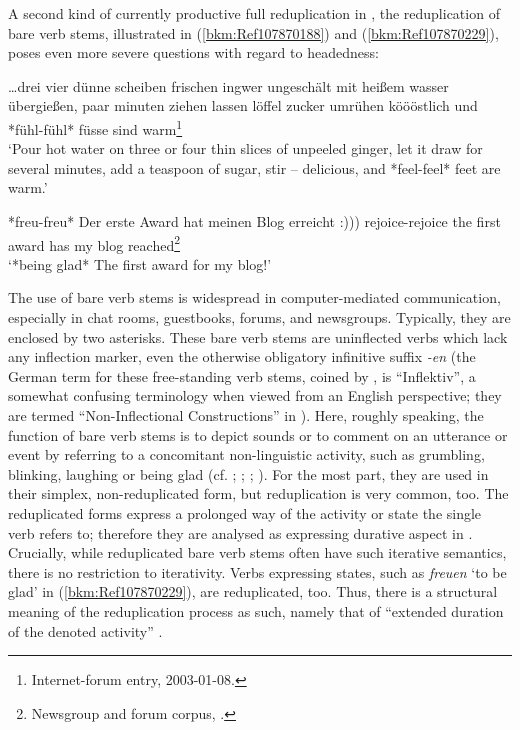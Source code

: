 \documentclass[output=paper
  ,nobabel
  ,draftmode
  ,colorlinks, citecolor=brown
]{langscibook}
\begin{document}
A second kind of currently productive full reduplication in , the reduplication of bare verb
stems, illustrated in (\ref{bkm:Ref107870188}) and (\ref{bkm:Ref107870229}), poses even more severe
questions with regard to headedness:

\ea
\label{bkm:Ref107870188}%
\ldots drei vier dünne scheiben frischen ingwer ungeschält mit heißem wasser übergießen, paar minuten ziehen lassen löffel zucker umrühen köööstlich und *fühl-fühl* füsse sind warm\footnote{Internet-forum entry, 2003-01-08.}\\
`Pour hot water on three or four thin slices of unpeeled ginger, let it draw for several minutes, add a teaspoon of sugar, stir – delicious, and *feel-feel* feet are warm.'
\z

\ea
\label{bkm:Ref107870229}%
*freu-freu*        Der erste Award hat  meinen Blog  erreicht :)))    rejoice-rejoice   the  first award   has  my       blog   reached\footnote{Newsgroup and forum corpus, .} \\
`*being glad* The first award for my blog!'
\z

\noindent
The use of bare verb stems is widespread in computer-mediated communication, especially in chat
rooms, guestbooks, forums, and newsgroups. Typically, they are enclosed by two asterisks. These bare
verb stems are uninflected verbs which lack any inflection marker, even the otherwise obligatory
infinitive suffix \emph{{}-en} (the German term for these free-standing verb stems, coined by
\citet{Teuber1999}, is ``Inflektiv'', a somewhat confusing terminology when viewed from an English
perspective; they are termed ``Non-Inflectional Constructions'' in ). Here,
roughly speaking, the function of bare verb stems is to depict sounds or to comment on an utterance
or event by referring to a concomitant non-linguistic activity, such as grumbling, blinking,
laughing or being glad (cf. \citealt[22--25]{Teuber1999}; \citealt[193--206]{Schlobinski2001};
\citealt[116–121]{Pankow2003}; \citealt[76–82]{BueckingRau2013}). For the most part, they are used in
their simplex, non-reduplicated form, but reduplication is very common, too. The reduplicated forms
express a prolonged way of the activity or state the single verb refers to; therefore they are
analysed as expressing durative aspect in . Crucially, while reduplicated
bare verb stems often have such iterative semantics, there is no restriction to iterativity. Verbs
expressing states, such as \emph{freuen} `to be glad' in (\ref{bkm:Ref107870229}), are reduplicated,
too. Thus, there is a structural meaning of the reduplication process as such, namely that of
``extended duration of the denoted activity'' \citep[936]{Freywald2015}.
\end{document}
